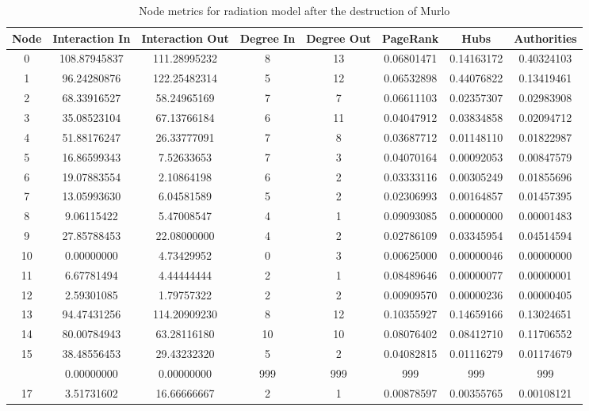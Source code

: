 \documentclass[12pt,a4paper]{thesis}
\begin{document}
\begin{table}[H]
\centering
\caption{Node metrics for radiation model after the destruction of Murlo}
\tiny
\begin{tabular}{|c|c|c|c|c|c|c|c|}
\hline	Node	&	Interaction In	&	Interaction Out	&	Degree In	&	Degree Out	&	PageRank	&	Hubs	&	Authorities	\\
\hline	0	&	108.87945837	&	111.28995232	&	8	&	13	&	0.06801471	&	0.14163172	&	0.40324103	\\
\hline	1	&	96.24280876	&	122.25482314	&	5	&	12	&	0.06532898	&	0.44076822	&	0.13419461	\\
\hline	2	&	68.33916527	&	58.24965169	&	7	&	7	&	0.06611103	&	0.02357307	&	0.02983908	\\
\hline	3	&	35.08523104	&	67.13766184	&	6	&	11	&	0.04047912	&	0.03834858	&	0.02094712	\\
\hline	4	&	51.88176247	&	26.33777091	&	7	&	8	&	0.03687712	&	0.01148110	&	0.01822987	\\
\hline	5	&	16.86599343	&	7.52633653	&	7	&	3	&	0.04070164	&	0.00092053	&	0.00847579	\\
\hline	6	&	19.07883554	&	2.10864198	&	6	&	2	&	0.03333116	&	0.00305249	&	0.01855696	\\
\hline	7	&	13.05993630	&	6.04581589	&	5	&	2	&	0.02306993	&	0.00164857	&	0.01457395	\\
\hline	8	&	9.06115422	&	5.47008547	&	4	&	1	&	0.09093085	&	0.00000000	&	0.00001483	\\
\hline	9	&	27.85788453	&	22.08000000	&	4	&	2	&	0.02786109	&	0.03345954	&	0.04514594	\\
\hline	10	&	0.00000000	&	4.73429952	&	0	&	3	&	0.00625000	&	0.00000046	&	0.00000000	\\
\hline	11	&	6.67781494	&	4.44444444	&	2	&	1	&	0.08489646	&	0.00000077	&	0.00000001	\\
\hline	12	&	2.59301085	&	1.79757322	&	2	&	2	&	0.00909570	&	0.00000236	&	0.00000405	\\
\hline	13	&	94.47431256	&	114.20909230	&	8	&	12	&	0.10355927	&	0.14659166	&	0.13024651	\\
\hline	14	&	80.00784943	&	63.28116180	&	10	&	10	&	0.08076402	&	0.08412710	&	0.11706552	\\
\hline	15	&	38.48556453	&	29.43232320	&	5	&	2	&	0.04082815	&	0.01116279	&	0.01174679	\\
\rowcolor{yellow}
\hline	16	&	0.00000000	&	0.00000000	&	999	&	999	&	999	&	999	&	999	\\
\hline	17	&	3.51731602	&	16.66666667	&	2	&	1	&	0.00878597	&	0.00355765	&	0.00108121	\\

\end{tabular}
\end{table}
\end{document}
